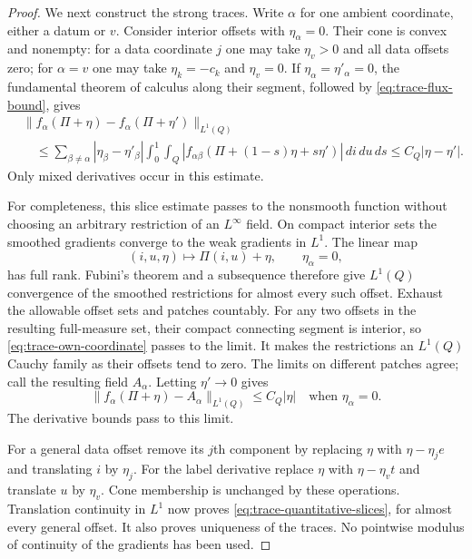 \begin{proof}
We next construct the strong traces.  Write $\alpha$ for one ambient
coordinate, either a datum or $v$.  Consider interior offsets with
$\eta_\alpha=0$.  Their cone is convex and nonempty: for a data
coordinate $j$ one may take $\eta_v>0$ and all data offsets zero; for
$\alpha=v$ one may take $\eta_k=-c_k$ and $\eta_v=0$.
If $\eta_\alpha=\eta'_\alpha=0$, the fundamental theorem of calculus
along their segment, followed by \eqref{eq:trace-flux-bound}, gives
\begin{equation}\label{eq:trace-own-coordinate}
 \begin{split}
 &\|f_\alpha(\Pi+\eta)-f_\alpha(\Pi+\eta')\|_{L^1(Q)}\\
 &\quad\le\sum_{\beta\ne\alpha}|\eta_\beta-\eta'_\beta|
       \int_0^1\int_Q
       |f_{\alpha\beta}(\Pi+(1-s)\eta+s\eta')|\,di\,du\,ds
 \le C_Q|\eta-\eta'|.
 \end{split}
\end{equation}
Only mixed derivatives occur in this estimate.

For completeness, this slice estimate passes to the nonsmooth function
without choosing an arbitrary restriction of an $L^\infty$ field.  On
compact interior sets the smoothed gradients converge to the weak
gradients in $L^1$.  The linear map
\[
 (i,u,\eta)\longmapsto\Pi(i,u)+\eta,
 \qquad \eta_\alpha=0,
\]
has full rank.  Fubini's theorem and a subsequence therefore give
$L^1(Q)$ convergence of the smoothed restrictions for almost every such
offset.  Exhaust the allowable offset sets and patches countably.  For
any two offsets in the resulting full-measure set, their compact
connecting segment is interior, so \eqref{eq:trace-own-coordinate}
passes to the limit.  It makes the restrictions an $L^1(Q)$ Cauchy family
as their offsets tend to zero.  The limits on different patches agree;
call the resulting field $A_\alpha$.  Letting $\eta'\to0$ gives
\[
 \|f_\alpha(\Pi+\eta)-A_\alpha\|_{L^1(Q)}\le C_Q|\eta|
 \quad\text{when }\eta_\alpha=0.
\]
The derivative bounds pass to this limit.

For a general data offset remove its $j$th component by replacing
$\eta$ with $\eta-\eta_je$ and translating $i$ by $\eta_j$.
For the label derivative replace $\eta$ with $\eta-\eta_vt$ and
translate $u$ by $\eta_v$.  Cone membership is unchanged by these
operations.  Translation continuity in $L^1$ now proves
\eqref{eq:trace-quantitative-slices}, for almost every general offset.
It also proves uniqueness of the traces.  No pointwise modulus of
continuity of the gradients has been used.


\end{proof}
